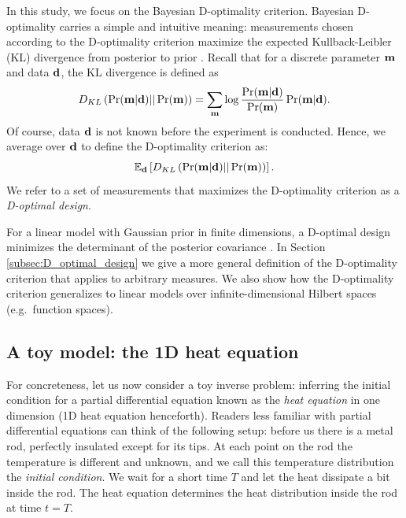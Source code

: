 In this study, we focus on the Bayesian D-optimality
criterion. Bayesian D-optimality carries a simple and intuitive
meaning: measurements chosen according to the D-optimality criterion
maximize the expected Kullback-Leibler (KL) divergence from posterior
to prior \cite{chaloner1995, AlexanderianGloorGhattas14,
  CoverThomas91}.
Recall that for a discrete parameter $\mathbf{m}$ and data $\mathbf{d}$, the KL
divergence is defined as
\begin{equation}\label{eq:basic_KL}
  D_{KL}\left (\Pr(\param|\data)||\Pr(\param)\right ) =  \sum_{\param} \log
  \frac{\Pr(\param|\data)}{\Pr(\param)} \Pr(\param|\data). 
\end{equation}
Of course, data $\mathbf{d}$ is not known before the experiment is
conducted. Hence, we average over $\mathbf{d}$ to define the D-optimality
criterion as:
\begin{equation*}
  \mathbb{E}_{\data}\left [ D_{KL}\left (\Pr(\param|\data)||\Pr(\param)\right ) \right ].
\end{equation*}
We refer to a set of measurements that maximizes the D-optimality
criterion as a \emph{D-optimal design}.

For a linear model with Gaussian prior in finite dimensions, a
D-optimal design minimizes the determinant of the posterior covariance
\cite{chaloner1995}. In Section \ref{subsec:D_optimal_design} we give
a more general definition of the D-optimality criterion that applies
to arbitrary measures. We also show how the D-optimality criterion
generalizes to linear models over infinite-dimensional Hilbert spaces
(e.g.~function spaces).

\subsection{A toy model: the 1D heat equation}\label{subsec:toy}
For concreteness, let us now consider a toy inverse problem: inferring
the initial condition for a partial differential equation known as the
\emph{heat equation} in one dimension (1D heat equation
henceforth). Readers less familiar with partial differential equations
can think of the following setup: before us there is a metal rod,
perfectly insulated except for its tips. At each point on the rod the
temperature is different and unknown, and we call this temperature
distribution the \emph{initial condition}. We wait for a short time
$T$ and let the heat dissipate a bit inside the rod. The heat equation
determines the heat distribution inside the rod at time $t=T$.

